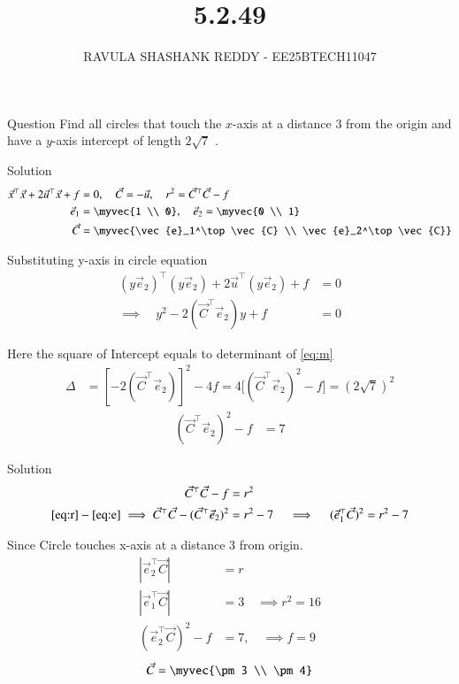 \documentclass{beamer}
\title %
{5.2.49}
\author %
{RAVULA SHASHANK REDDY - EE25BTECH11047}
\begin{document}
	
	
	\frame{\titlepage}
	\begin{frame}{Question}
     Find all circles that touch the $x$-axis at a distance $3$ from the origin and have a $y$-axis intercept of length $2\sqrt{7}$ .\\
\end{frame}
\begin{frame}{Solution}
    \begin{align}
\vec{x}^\top \vec{x} + 2 \vec{u}^\top \vec{x} + f &= 0, \quad \vec{C} = -\vec{u}, \quad r^2 = \vec{C}^\top \vec{C} - f \\
\vec{e}_1 &= \myvec{1 \\ 0}, \quad \vec{e}_2 = \myvec{0 \\ 1}\\
\quad \vec{C}&=\myvec{\vec{e}_1^\top \vec{C} \\ \vec{e}_2^\top \vec{C}}
\end{align}

Substituting y-axis in circle equation
\begin{align}
(y \vec{e}_2)^\top (y \vec{e}_2) + 2 \vec{u}^\top (y \vec{e}_2) + f &= 0 
\\ \implies \quad 
y^2 - 2 (\vec{C}^\top \vec{e}_2) y + f &= 0 \label{eq:m}
\end{align}

Here the square of Intercept equals to determinant of \eqref{eq:m}
\begin{align}
\Delta &= [-2 (\vec{C}^\top \vec{e}_2)]^2 - 4 f = 4 \big[ (\vec{C}^\top \vec{e}_2)^2 - f \big]=(2\sqrt{7})^2
\end{align}
\begin{align}
(\vec{C}^\top \vec{e}_2)^2 - f &= 7 \label{eq:e}
\end{align}
\end{frame}
\begin{frame}{Solution}
\begin{align}
\vec{C}^\top \vec{C} - f&=r^2 \label{eq:r}\\
\eqref{eq:r}-\eqref{eq:e}\implies\vec{C}^\top \vec{C} - (\vec{C}^\top \vec{e}_2)^2 &= r^2 - 7 
\quad \implies \quad (\vec{e}_1^\top \vec{C})^2 = r^2 - 7 
\end{align}

Since Circle touches x-axis at a distance 3 from origin. 
\begin{align}
|\vec{e}_2^\top \vec{C}|&=r\\
|\vec{e}_1^\top \vec{C}| &= 3 \quad \implies r^2 = 16 \\
(\vec{e}_2^\top \vec{C})^2 - f &= 7, \quad \implies f=9
\end{align}
\begin{align}
\vec{C} = \myvec{\pm3 \\ \pm4}
\end{align}
\end{frame}
\end{document}
